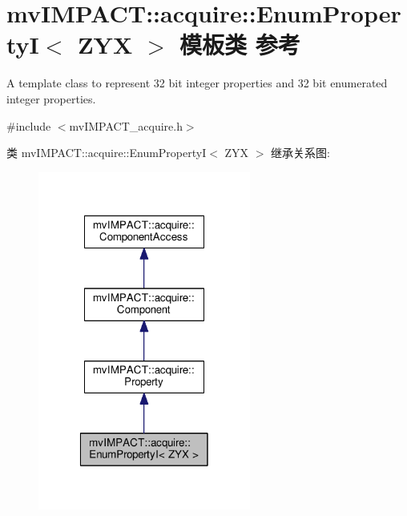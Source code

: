 \hypertarget{classmv_i_m_p_a_c_t_1_1acquire_1_1_enum_property_i}{\section{mv\+I\+M\+P\+A\+C\+T\+:\+:acquire\+:\+:Enum\+Property\+I$<$ Z\+Y\+X $>$ 模板类 参考}
\label{classmv_i_m_p_a_c_t_1_1acquire_1_1_enum_property_i}
}


A template class to represent 32 bit integer properties and 32 bit enumerated integer properties.  




{\ttfamily \#include $<$mv\+I\+M\+P\+A\+C\+T\+\_\+acquire.\+h$>$}



类 mv\+I\+M\+P\+A\+C\+T\+:\+:acquire\+:\+:Enum\+Property\+I$<$ Z\+Y\+X $>$ 继承关系图\+:
\nopagebreak
\begin{figure}[H]
\begin{center}
\leavevmode
\includegraphics[width=198pt]{classmv_i_m_p_a_c_t_1_1acquire_1_1_enum_property_i__inherit__graph}
\end{center}
\end{figure}


